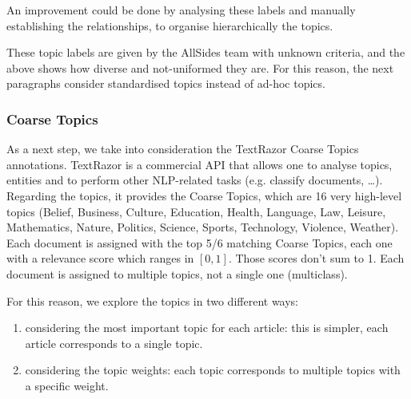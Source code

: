 An improvement could be done by analysing these labels and manually establishing the relationships, to organise hierarchically the topics.




These topic labels are given by the AllSides team with unknown criteria, and the above shows how diverse and not-uniformed they are.
For this reason, the next paragraphs consider standardised topics instead of ad-hoc topics.


\subsubsection{\statusgreen Coarse Topics}

As a next step, we take into consideration the TextRazor Coarse Topics annotations. TextRazor is a commercial API that allows one to analyse topics, entities and to perform other NLP-related tasks (e.g. classify documents, …).
Regarding the topics, it provides the Coarse Topics, which are 16 very high-level topics (Belief, Business, Culture, Education, Health, Language, Law, Leisure, Mathematics, Nature, Politics, Science, Sports, Technology, Violence, Weather).
Each document is assigned with the top 5/6 matching Coarse Topics, each one with a relevance score which ranges in $[0,1]$. Those scores don’t sum to 1. Each document is assigned to multiple topics, not a single one (multiclass).

For this reason, we explore the topics in two different ways:

\begin{enumerate}
    \item considering the most important topic for each article: this is simpler, each article corresponds to a single topic.
    \item considering the topic weights: each topic corresponds to multiple topics with a specific weight.
\end{enumerate}

